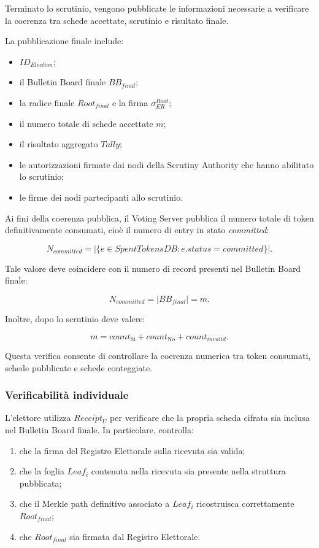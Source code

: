 \documentclass[a4paper,12pt]{article}
\begin{document}
Terminato lo scrutinio, vengono pubblicate le informazioni necessarie a verificare la coerenza tra schede accettate, scrutinio e risultato finale.

La pubblicazione finale include:

\begin{itemize}
	\item \(ID_{Election}\);
	\item il Bulletin Board finale \(BB_{final}\);
	\item la radice finale \(Root_{final}\) e la firma \(\sigma_{ER}^{Root}\);
	\item il numero totale di schede accettate \(m\);
	\item il risultato aggregato \(Tally\);
	\item le autorizzazioni firmate dai nodi della Scrutiny Authority che hanno abilitato lo scrutinio;
	\item le firme dei nodi partecipanti allo scrutinio.
\end{itemize}

Ai fini della coerenza pubblica, il Voting Server pubblica il numero totale di token definitivamente consumati, cio\`e il numero di entry in stato \emph{committed}:

\[
	N_{committed} =
	|\{e \in SpentTokensDB : e.status = committed\}|.
\]

Tale valore deve coincidere con il numero di record presenti nel Bulletin Board finale:

\[
	N_{committed} = |BB_{final}| = m.
\]

Inoltre, dopo lo scrutinio deve valere:

\[
	m = count_{\text{S\`i}} + count_{\text{No}} + count_{invalid}.
\]

Questa verifica consente di controllare la coerenza numerica tra token consumati, schede pubblicate e schede conteggiate.

\subsubsection{Verificabilit\`a individuale}

L'elettore utilizza \(Receipt_U\) per verificare che la propria scheda cifrata sia inclusa nel Bulletin Board finale.
In particolare, controlla:

\begin{enumerate}
	\item che la firma del Registro Elettorale sulla ricevuta sia valida;
	\item che la foglia \(Leaf_i\) contenuta nella ricevuta sia presente nella struttura pubblicata;
	\item che il Merkle path definitivo associato a \(Leaf_i\) ricostruisca correttamente \(Root_{final}\);
	\item che \(Root_{final}\) sia firmata dal Registro Elettorale.
\end{enumerate}
\end{document}
